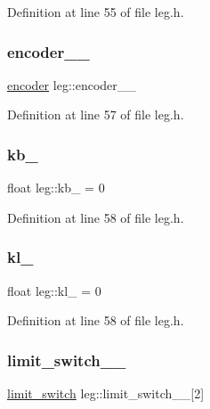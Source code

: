 Definition at line 55 of file leg.\+h.

\mbox{\label{classleg_af6548dbf60a17b49bb4e1da05d0fa933}} 
\subsubsection{\texorpdfstring{encoder\_\_}{encoder\_\_}}
{\footnotesize\ttfamily \mbox{\hyperlink{classencoder}{encoder}} leg\+::encoder\+\_\+\+\_\+\hspace{0.3cm}{\ttfamily [private]}}



Definition at line 57 of file leg.\+h.

\mbox{\label{classleg_aa194c6b132602343180086d5833bf8c5}} 
\subsubsection{\texorpdfstring{kb\_}{kb\_}}
{\footnotesize\ttfamily float leg\+::kb\+\_\+ = 0\hspace{0.3cm}{\ttfamily [private]}}



Definition at line 58 of file leg.\+h.

\mbox{\label{classleg_a144a04feb03f076f7883c46a90296485}} 
\subsubsection{\texorpdfstring{kl\_}{kl\_}}
{\footnotesize\ttfamily float leg\+::kl\+\_\+ = 0\hspace{0.3cm}{\ttfamily [private]}}



Definition at line 58 of file leg.\+h.

\mbox{\label{classleg_a3c984e90c4004c8dae1e2723fc7eaf52}} 
\subsubsection{\texorpdfstring{limit\_switch\_\_}{limit\_switch\_\_}}
{\footnotesize\ttfamily \mbox{\hyperlink{structlimit__switch}{limit\+\_\+switch}} leg\+::limit\+\_\+switch\+\_\+\+\_\+\mbox{[}2\mbox{]}}



